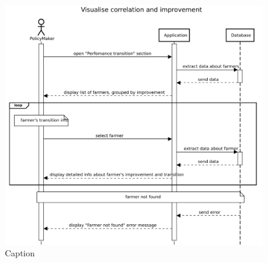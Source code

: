 \begin{figure}[H]
    \centering
    \includegraphics[scale=0.5]{Images/Sequence diagrams/PolicyMaker - visualise correlation and improvement.pdf}
    \caption{Caption}
    \label{fig:my_label}
\end{figure}